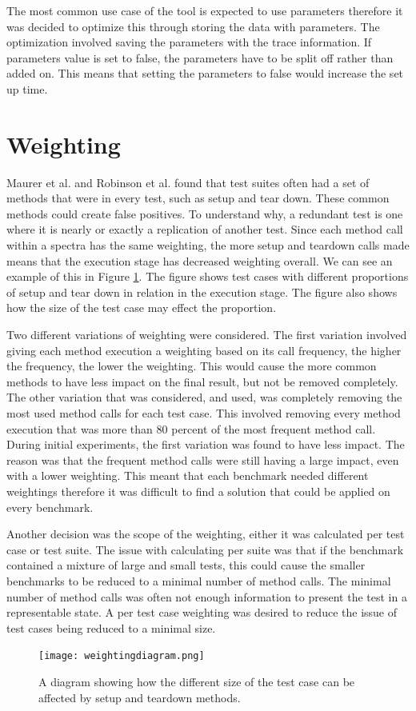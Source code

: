 The most common use case of the tool is expected to use parameters therefore it was decided to optimize this through storing the data with parameters. The optimization involved saving the parameters with the trace information. If parameters value is set to false, the parameters have to be split off rather than added on. This means that setting the parameters to false would increase the set up time.

\section{Weighting}
Maurer et al. \cite{koochakzadeh2009test} and Robinson et al. \cite{li2008static} found that test suites often had a set of methods that were in every test, such as setup and tear down. These common methods could create false positives. To understand why, a redundant test is one where it is nearly or exactly a replication of another test. Since each method call within a spectra has the same weighting, the more setup and teardown calls made means that the execution stage has decreased weighting overall. We can see an example of this in Figure \ref{fig:weightingdiagram}. The figure shows test cases with different proportions of setup and tear down in relation in the execution stage. The figure also shows how the size of the test case may effect the proportion.

Two different variations of weighting were considered. The first variation involved giving each method execution a weighting based on its call frequency, the higher the frequency, the lower the weighting. This would cause the more common methods to have less impact on the final result, but not be removed completely. The other variation that was considered, and used, was completely removing the most used method calls for each test case. This involved removing every method execution that was more than 80 percent of the most frequent method call. During initial experiments, the first variation was found to have less impact. The reason was that the frequent method calls were still having a large impact, even with a lower weighting. This meant that each benchmark needed different weightings therefore it was difficult to find a solution that could be applied on every benchmark.

Another decision was the scope of the weighting, either it was calculated per test case or test suite. The issue with calculating per suite was that if the benchmark contained a mixture of large and small tests, this could cause the smaller benchmarks to be reduced to a minimal number of method calls. The minimal number of method calls was often not enough information to present the test in a representable state. A per test case weighting was desired to reduce the issue of test cases being reduced to a minimal size.

\begin{figure}[h]
\texttt{[image: weightingdiagram.png]}
\caption{A diagram showing how the different size of the test case can be affected by setup and teardown methods.}
\label{fig:weightingdiagram}
\end{figure}